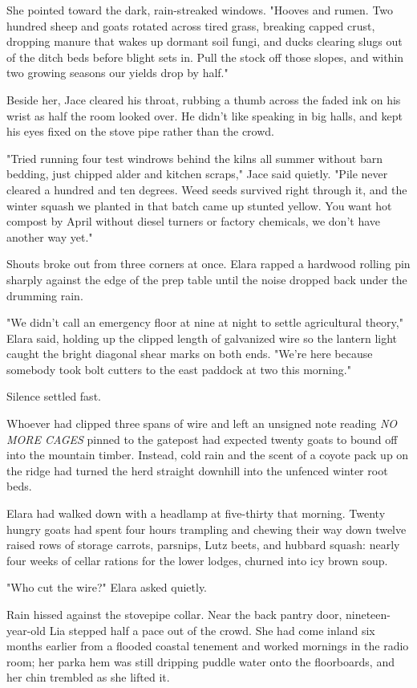 She pointed toward the dark, rain-streaked windows. "Hooves and rumen. Two hundred sheep and goats rotated across tired grass, breaking capped crust, dropping manure that wakes up dormant soil fungi, and ducks clearing slugs out of the ditch beds before blight sets in. Pull the stock off those slopes, and within two growing seasons our yields drop by half."

Beside her, Jace cleared his throat, rubbing a thumb across the faded ink on his wrist as half the room looked over. He didn't like speaking in big halls, and kept his eyes fixed on the stove pipe rather than the crowd.

"Tried running four test windrows behind the kilns all summer without barn bedding, just chipped alder and kitchen scraps," Jace said quietly. "Pile never cleared a hundred and ten degrees. Weed seeds survived right through it, and the winter squash we planted in that batch came up stunted yellow. You want hot compost by April without diesel turners or factory chemicals, we don't have another way yet."

Shouts broke out from three corners at once. Elara rapped a hardwood rolling pin sharply against the edge of the prep table until the noise dropped back under the drumming rain.

"We didn't call an emergency floor at nine at night to settle agricultural theory," Elara said, holding up the clipped length of galvanized wire so the lantern light caught the bright diagonal shear marks on both ends. "We're here because somebody took bolt cutters to the east paddock at two this morning."

Silence settled fast.

Whoever had clipped three spans of wire and left an unsigned note reading \textit{NO MORE CAGES} pinned to the gatepost had expected twenty goats to bound off into the mountain timber. Instead, cold rain and the scent of a coyote pack up on the ridge had turned the herd straight downhill into the unfenced winter root beds.

Elara had walked down with a headlamp at five-thirty that morning. Twenty hungry goats had spent four hours trampling and chewing their way down twelve raised rows of storage carrots, parsnips, Lutz beets, and hubbard squash: nearly four weeks of cellar rations for the lower lodges, churned into icy brown soup.

"Who cut the wire?" Elara asked quietly.

Rain hissed against the stovepipe collar. Near the back pantry door, nineteen-year-old Lia stepped half a pace out of the crowd. She had come inland six months earlier from a flooded coastal tenement and worked mornings in the radio room; her parka hem was still dripping puddle water onto the floorboards, and her chin trembled as she lifted it.

